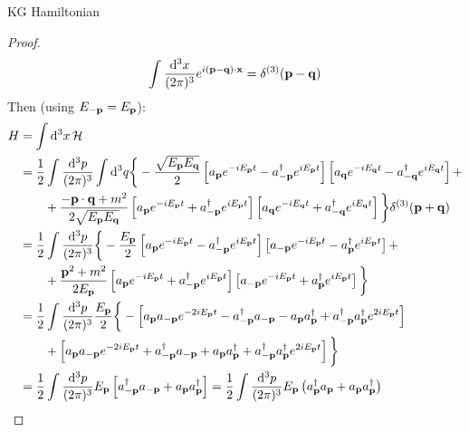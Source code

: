 \begin{proposition}{KG Hamiltonian}{}
\begin{proof}
\begin{equation}
      \int \frac{\mathrm{d}^3x}{(2\pi)^3} e^{i (\mathbf{p} - \mathbf{q}) \cdot \mathbf{x}} = \delta^{(3)}(\mathbf{p} - \mathbf{q})
      \label{eq:2.8}
    \end{equation}
    Then (using $ E_{-\mathbf{p}} = E_{\mathbf{p}} $):
    \begin{equation*}
      \begin{split}
        H
        &= \int \mathrm{d}^3x\, \mathcal{H} \\
        &= \frac{1}{2} \int \frac{\mathrm{d}^3 p}{(2\pi)^3} \int \mathrm{d}^3 q \bigg\{ - \frac{\sqrt{E_{\mathbf{p}} E_{\mathbf{q}}}}{2} \left[ a_{\mathbf{p}} e^{-i E_{\mathbf{p}} t} - a_{-\mathbf{p}}^\dagger e^{i E_{\mathbf{p}} t} \right] \left[ a_{\mathbf{q}} e^{-i E_{\mathbf{q}} t} - a_{-\mathbf{q}}^\dagger e^{i E_{\mathbf{q}} t} \right] + \\
        & \qquad + \frac{- \mathbf{p} \cdot \mathbf{q} + m^2}{2\sqrt{E_{\mathbf{p}} E_{\mathbf{q}}}} \left[ a_{\mathbf{p}} e^{-i E_{\mathbf{p}} t} + a_{-\mathbf{p}}^\dagger e^{i E_{\mathbf{p}} t} \right] \left[ a_{\mathbf{q}} e^{-i E_{\mathbf{q}} t} + a_{-\mathbf{q}}^\dagger e^{i E_{\mathbf{q}} t} \right] \bigg\} \delta^{(3)}(\mathbf{p} + \mathbf{q}) \\
        &= \frac{1}{2} \int \frac{\mathrm{d}^3 p}{(2\pi)^3} \bigg\{ - \frac{E_{\mathbf{p}}}{2} \left[ a_{\mathbf{p}} e^{-i E_{\mathbf{p}} t} - a_{-\mathbf{p}}^\dagger e^{i E_{\mathbf{p}} t} \right] \left[ a_{-\mathbf{p}} e^{-i E_{\mathbf{p}} t} - a_{\mathbf{p}}^\dagger e^{i E_{\mathbf{p}} t} \right] + \\
        & \qquad + \frac{\mathbf{p}^2 + m^2}{2E_{\mathbf{p}}} \left[ a_{\mathbf{p}} e^{-i E_{\mathbf{p}} t} + a_{-\mathbf{p}}^\dagger e^{i E_{\mathbf{p}} t} \right] \left[ a_{-\mathbf{p}} e^{-i E_{\mathbf{p}} t} + a_{\mathbf{p}}^\dagger e^{i E_{\mathbf{p}} t} \right] \bigg\} \\
        &= \frac{1}{2} \int \frac{\mathrm{d}^3p}{(2\pi)^3} \frac{E_{\mathbf{p}}}{2} \bigg\{ - \left[ a_{\mathbf{p}} a_{-\mathbf{p}} e^{-2i E_{\mathbf{p}} t} - a_{-\mathbf{p}}^\dagger a_{-\mathbf{p}} - a_{\mathbf{p}} a_{\mathbf{p}}^\dagger + a_{-\mathbf{p}}^\dagger a_{\mathbf{p}}^\dagger e^{2i E_{\mathbf{p}} t} \right] \\
        & \qquad + \left[ a_{\mathbf{p}} a_{-\mathbf{p}} e^{-2i E_{\mathbf{p}} t} + a_{-\mathbf{p}}^\dagger a_{-\mathbf{p}} + a_{\mathbf{p}} a_{\mathbf{p}}^\dagger + a_{-\mathbf{p}}^\dagger a_{\mathbf{p}}^\dagger e^{2i E_{\mathbf{p}} t} \right] \bigg\} \\
        &= \frac{1}{2} \int \frac{\mathrm{d}^3p}{(2\pi)^3} E_{\mathbf{p}} \left[ a_{-\mathbf{p}}^\dagger a_{-\mathbf{p}} + a_{\mathbf{p}} a_{\mathbf{p}}^\dagger \right] = \frac{1}{2} \int \frac{\mathrm{d}^3p}{(2\pi)^3} E_{\mathbf{p}} \left( a_{\mathbf{p}}^\dagger a_{\mathbf{p}} + a_{\mathbf{p}} a_{\mathbf{p}}^\dagger \right)
      \end{split}
    \end{equation*}
  \end{proof}
\end{proposition}

